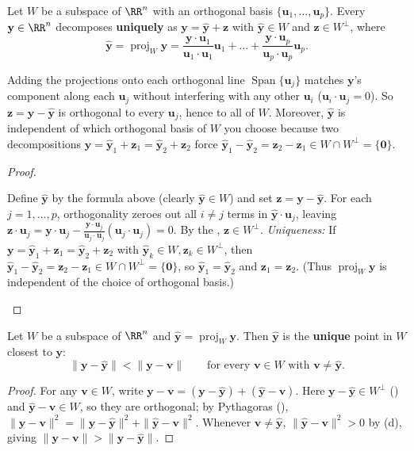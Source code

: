 \documentclass[10pt]{scrartcl}
\newcommand{\vv}[1]{\mathbf{#1}}
\DeclareMathOperator{\spn}{Span}\DeclareMathOperator{\Nul}{Nul}\DeclareMathOperator{\Col}{Col}\DeclareMathOperator{\Row}{Row}\DeclareMathOperator{\tr}{tr}\DeclareMathOperator{\proj}{proj}\DeclareMathOperator{\dist}{dist}
\begin{document}
\begin{theorem*}
  Let $W$ be a subspace of $\RR^n$ with an orthogonal basis $\{\vv u_1,\dots,\vv u_p\}$. Every $\vv y\in\RR^n$ decomposes \textbf{uniquely} as $\vv y=\hat{\vv y}+\vv z$ with $\hat{\vv y}\in W$ and $\vv z\in W^\perp$, where
  \[
    \hat{\vv y} = \proj_W\vv y = \frac{\vv y\cdot\vv u_1}{\vv u_1\cdot\vv u_1}\vv u_1 + \dots + \frac{\vv y\cdot\vv u_p}{\vv u_p\cdot\vv u_p}\vv u_p.
  \]
\end{theorem*}
\begin{ideabox}
  Adding the projections onto each orthogonal line $\spn\{\vv u_j\}$ matches $\vv y$'s component along each $\vv u_j$ without interfering with any other $\vv u_i$ ($\vv u_i\cdot\vv u_j=0$). So $\vv z=\vv y-\hat{\vv y}$ is orthogonal to every $\vv u_j$, hence to all of $W$. Moreover, $\hat{\vv y}$ is independent of which orthogonal basis of $W$ you choose because two decompositions $\vv y=\hat{\vv y}_1+\vv z_1=\hat{\vv y}_2+\vv z_2$ force $\hat{\vv y}_1-\hat{\vv y}_2 = \vv z_2-\vv z_1 \in W\cap W^\perp=\{\vv 0\}$.
\end{ideabox}
\begin{proof}
  \begin{steps}
    \ii Define $\hat{\vv y}$ by the formula above (clearly $\hat{\vv y}\in W$) and set $\vv z=\vv y-\hat{\vv y}$.
    \ii For each $j=1,\dots,p$, orthogonality zeroes out all $i\neq j$ terms in $\hat{\vv y}\cdot\vv u_j$, leaving $\vv z\cdot\vv u_j = \vv y\cdot\vv u_j - \frac{\vv y\cdot\vv u_j}{\vv u_j\cdot\vv u_j}(\vv u_j\cdot\vv u_j)=0$. By the , $\vv z\in W^\perp$.
    \ii \emph{Uniqueness:} If $\vv y=\hat{\vv y}_1+\vv z_1=\hat{\vv y}_2+\vv z_2$ with $\hat{\vv y}_k\in W,\vv z_k\in W^\perp$, then $\hat{\vv y}_1-\hat{\vv y}_2=\vv z_2-\vv z_1\in W\cap W^\perp=\{\vv 0\}$, so $\hat{\vv y}_1=\hat{\vv y}_2$ and $\vv z_1=\vv z_2$. (Thus $\proj_W\vv y$ is independent of the choice of orthogonal basis.)
  \end{steps}
\end{proof}

\begin{theorem*}
  Let $W$ be a subspace of $\RR^n$ and $\hat{\vv y}=\proj_W\vv y$. Then $\hat{\vv y}$ is the \textbf{unique} point in $W$ closest to $\vv y$:
  \[
    \|\vv y-\hat{\vv y}\| < \|\vv y-\vv v\| \qquad \text{for every }\vv v\in W\text{ with }\vv v\ne\hat{\vv y}.
  \]
\end{theorem*}
\begin{proof}
  For any $\vv v\in W$, write $\vv y-\vv v = (\vv y-\hat{\vv y}) + (\hat{\vv y}-\vv v)$. Here $\vv y-\hat{\vv y}\in W^\perp$ () and $\hat{\vv y}-\vv v\in W$, so they are orthogonal; by Pythagoras (), $\|\vv y-\vv v\|^2=\|\vv y-\hat{\vv y}\|^2+\|\hat{\vv y}-\vv v\|^2$. Whenever $\vv v\neq\hat{\vv y}$, $\|\hat{\vv y}-\vv v\|^2>0$ by (d), giving $\|\vv y-\vv v\|>\|\vv y-\hat{\vv y}\|$.
\end{proof}
\end{document}
